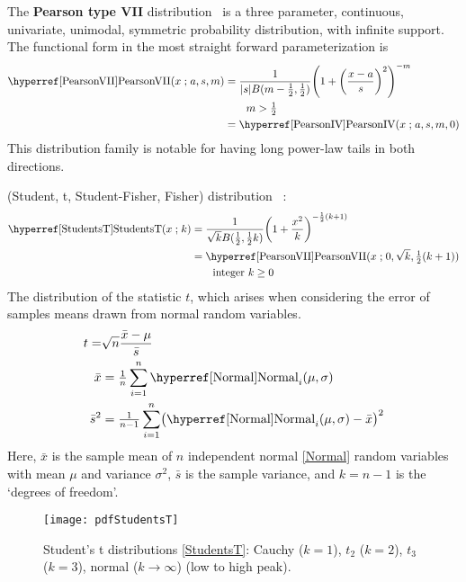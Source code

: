 


The {\bf Pearson type VII} distribution~\cite{Pearson1916} is a three parameter, continuous, univariate, unimodal, symmetric probability distribution, with infinite support. The functional form in the most straight forward parameterization is
\begin{align}
\label{PearsonVII}
\opr{PearsonVII}(x\given a,s, m) 
&= \frac{1}{|s| B(m-\frac{1}{2}, \frac{1}{2} )} \Left( 1 +\Left( \frac{x-a}{s}\Right)^2 \Right)^{-m} 	\checked
\\ \notag
& \qquad m > \tfrac{1}{2}
\\ \notag & = \opr{PearsonIV}(x\given a,s, m,0)  \checked
\end{align}
This distribution family is notable for having long power-law tails in both directions. 




 (Student, t, Student-Fisher, Fisher) distribution~\cite{Student1908,Fisher1925b,Hanley2008, Zabell2008} :
\begin{align}
\label{StudentsT}
\opr{StudentsT}(x\given k) 
&= \frac{1}{\sqrt{k} B(\frac{1}{2}, \frac{1}{2} k)} \Left( 1 + \frac{x^2}{k} \Right)^{-\frac{1}{2}(k+1)} \checked
\\ &= \opr{PearsonVII}(x\given 0,\sqrt{k},\tfrac{1}{2}(k+1)) \checked
\notag
\\ & \qquad \text{integer } k \geq 0
\notag
\end{align}
The distribution of the statistic $t$, which arises when considering the error of samples means drawn from normal random variables.
\begin{align*}
	t =& \sqrt{n} \frac {\bar{x} - \mu}{\bar{s}}  \checked \\ 
	\bar{x} & = \tfrac{1}{n} \sum_{i=1}^{n} \opr{Normal}_i (\mu,\sigma)   \checked \\
	\bar{s}^2 &= \tfrac{1}{n-1} \sum_{i=1}^{n} \bigl( \opr{Normal}_i (\mu,\sigma) - \bar{x} \bigr)^2 \checked
\end{align*}
Here, $\bar{x}$ is the sample mean of $n$ independent normal \eqref{Normal} random variables with mean $\mu$ and variance  $\sigma^2$, $\bar{s}$ is the sample variance, and $k=n-1$ is the `degrees of freedom'.


\begin{figure}[t]
\begin{center}
\texttt{[image: pdfStudentsT]}
\end{center}
\caption[Student's t distributions]{Student's t distributions \eqref{StudentsT}: Cauchy ($k=1$), $t_2$ ($k=2$), $t_3$ ($k=3$), normal ($k\rightarrow\infty$) (low to high peak).}
\end{figure}

